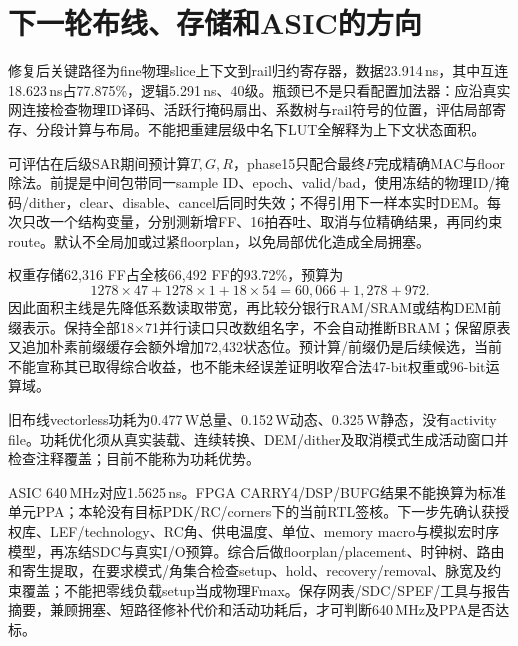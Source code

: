\section{下一轮布线、存储和ASIC的方向}
修复后关键路径为fine物理slice上下文到rail归约寄存器，数据23.914\,ns，其中互连18.623\,ns占77.875\%，逻辑5.291\,ns、40级。瓶颈已不是只看配置加法器：应沿真实网连接检查物理ID译码、活跃行掩码扇出、系数树与rail符号的位置，评估局部寄存、分段计算与布局。不能把重建层级中名下LUT全解释为上下文状态面积。

可评估在后级SAR期间预计算\(T,G,R\)，phase15只配合最终\(F\)完成精确MAC与floor除法。前提是中间包带同一sample ID、epoch、valid/bad，使用冻结的物理ID/掩码/dither，clear、disable、cancel后同时失效；不得引用下一样本实时DEM。每次只改一个结构变量，分别测新增FF、16拍吞吐、取消与位精确结果，再同约束route。默认不全局加或过紧floorplan，以免局部优化造成全局拥塞。

权重存储62,316 FF占全核66,492 FF的93.72\%，预算为
\[
1278\times47+1278\times1+18\times54
=60,066+1,278+972.
\]
因此面积主线是先降低系数读取带宽，再比较分银行RAM/SRAM或结构DEM前缀表示。保持全部18\(\times\)71并行读口只改数组名字，不会自动推断BRAM；保留原表又追加朴素前缀缓存会额外增加72,432状态位。预计算/前缀仍是后续候选，当前不能宣称其已取得综合收益，也不能未经误差证明收窄合法47-bit权重或96-bit运算域。

旧布线vectorless功耗为0.477\,W总量、0.152\,W动态、0.325\,W静态，没有activity file。功耗优化须从真实装载、连续转换、DEM/dither及取消模式生成活动窗口并检查注释覆盖；目前不能称为功耗优势。

ASIC 640\,MHz对应1.5625\,ns。FPGA CARRY4/DSP/BUFG结果不能换算为标准单元PPA；本轮没有目标PDK/RC/corners下的当前RTL签核。下一步先确认获授权库、LEF/technology、RC角、供电温度、单位、memory macro与模拟宏时序模型，再冻结SDC与真实I/O预算。综合后做floorplan/placement、时钟树、路由和寄生提取，在要求模式/角集合检查setup、hold、recovery/removal、脉宽及约束覆盖；不能把零线负载setup当成物理Fmax。保存网表/SDC/SPEF/工具与报告摘要，兼顾拥塞、短路径修补代价和活动功耗后，才可判断640\,MHz及PPA是否达标。
